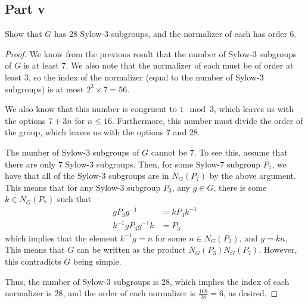 \documentclass[12pt,reqno]{amsart}
\newcommand{\inv}{^{-1}}
\begin{document}
\subsection*{Part v}
Show that $G$ has $28$ Sylow-$3$ subgroups, and the normalizer of each has order
$6$.
\\
\begin{proof}
We know from the previous result that the number of Sylow-$3$ subgroups of $G$
    is at least $7$. We also note that the normalizer of each must be of order
    at least $3$, so the index of the normalizer (equal to the number of
    Sylow-$3$ subgroups) is at most $2^3\times 7=56$.
    
    We also know that this number is congruent to $1\mod 3$,
    which leaves us with the options $7+3n$ for $n\leq16$. Furthermore, this number
    must divide the order of the group, which leaves us with the options
    $7$ and $28$.

    The number of Sylow-$3$ subgroups of $G$ cannot be $7$. To see this, assume
    that there are only $7$ Sylow-$3$ subgroups. Then, for some Sylow-$7$
    subgroup $P_7$, we have that all of the Sylow-$3$ subgroups are in
    $N_G(P_7)$ by the above argument. This means that for any Sylow-$3$ subgroup
    $P_3$, any $g\in G$, there is some $k\in N_G(P_7)$ such that
    \[
        \begin{aligned}
            gP_3g\inv &= kP_3k\inv\\
            k\inv gP_3 g\inv k &= P_3
        \end{aligned}
    \]
    which implies that the element $k\inv g=n$ for some $n\in N_G(P_3)$, and
    $g=kn$, This means that $G$
    can be written as the product $N_G(P_3)N_G(P_7)$. However, this contradicts
    $G$ being simple.

    Thus, the number of Sylow-$3$ subgroups is $28$, which implies the index
    of each normalizer is $28$, and the order of each normalizer is
    $\frac{168}{28}=6$, as desired.
\end{proof}
\end{document}
